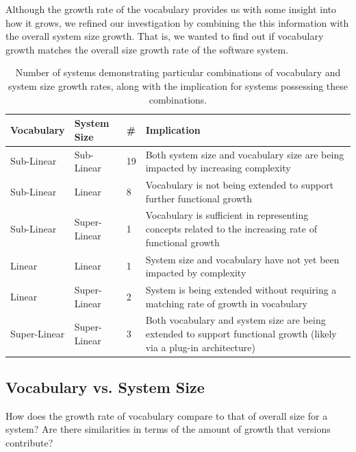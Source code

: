 Although the growth rate of the vocabulary provides us with some insight into how it grows,
we refined our investigation by combining the this information with the overall system size growth. That is, we wanted to find out if vocabulary growth matches the overall size growth rate of the software system.

\begin{table}[t]
\centering
\begin{tabular}{|p{}|p{}|p{}|p{}|}
\hline
{\bf Vocabulary} & {\bf System Size} & {\bf \#} & {\bf Implication} \\
\hline
\hline
Sub-Linear
&
Sub-Linear
&
19
&
Both system size and vocabulary size are being impacted by increasing complexity
\\
\hline
Sub-Linear
&
Linear
&
8
&
Vocabulary is not being extended to support further functional growth
\\
\hline
Sub-Linear
&
Super-Linear
&
1
&
Vocabulary is sufficient in representing concepts related to the increasing rate of functional growth
\\
\hline
Linear
&
Linear
&
1
&
System size and vocabulary have not yet been impacted by complexity
\\
\hline
Linear
&
Super-Linear
&
2
&
System is being extended without requiring a matching rate of growth in vocabulary
\\
\hline
Super-Linear
&
Super-Linear
&
3
&
Both vocabulary and system size are being extended to support functional growth (likely via a plug-in architecture)
\\
\hline
\end{tabular}
\vspace{0.2cm}
\caption{Number of systems demonstrating particular combinations of vocabulary and system size growth rates, along with the implication for systems possessing these combinations.}
\label{tab:growth_rate_results}
\vspace{-0.2cm}
\end{table}


\subsection{Vocabulary vs. System Size} %
\label{ssub:vocabulary_vs_system_size}

How does the growth rate of vocabulary compare to that of overall size for a system? Are there similarities in terms of the amount of growth that versions contribute?

